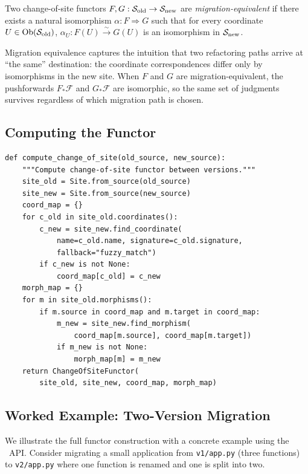 \documentclass[11pt]{article}
\newcommand{\SiteOld}{\Site_{\mathrm{old}}}
\newcommand{\SiteNew}{\Site_{\mathrm{new}}}
\newcommand{\FunctorF}{F}
\newcommand{\Pushforward}{F_*}
\begin{document}
\begin{definition}\label{def:mig-equiv}
Two change-of-site functors $\FunctorF, G : \SiteOld \to \SiteNew$ are
\emph{migration-equivalent} if there exists a natural isomorphism
$\alpha : \FunctorF \Rightarrow G$ such that for every coordinate $U \in
\Ob(\SiteOld)$, $\alpha_U : \FunctorF(U) \xrightarrow{\sim} G(U)$ is an
isomorphism in $\SiteNew$.
\end{definition}

Migration equivalence captures the intuition that two refactoring paths
arrive at ``the same'' destination: the coordinate correspondences differ
only by isomorphisms in the new site.  When $\FunctorF$ and $G$ are
migration-equivalent, the pushforwards $\Pushforward\mathcal{F}$ and
$G_*\mathcal{F}$ are isomorphic, so the same set of judgments survives
regardless of which migration path is chosen.

\subsection{Computing the Functor}

\begin{lstlisting}[style=jugeo-python]
def compute_change_of_site(old_source, new_source):
    """Compute change-of-site functor between versions."""
    site_old = Site.from_source(old_source)
    site_new = Site.from_source(new_source)
    coord_map = {}
    for c_old in site_old.coordinates():
        c_new = site_new.find_coordinate(
            name=c_old.name, signature=c_old.signature,
            fallback="fuzzy_match")
        if c_new is not None:
            coord_map[c_old] = c_new
    morph_map = {}
    for m in site_old.morphisms():
        if m.source in coord_map and m.target in coord_map:
            m_new = site_new.find_morphism(
                coord_map[m.source], coord_map[m.target])
            if m_new is not None:
                morph_map[m] = m_new
    return ChangeOfSiteFunctor(
        site_old, site_new, coord_map, morph_map)
\end{lstlisting}

\subsection{Worked Example: Two-Version Migration}\label{sec:worked-example}

We illustrate the full functor construction with a concrete example using
the \JuGeo\ API.  Consider migrating a small application from
\texttt{v1/app.py} (three functions) to \texttt{v2/app.py} where one
function is renamed and one is split into two.
\end{document}
